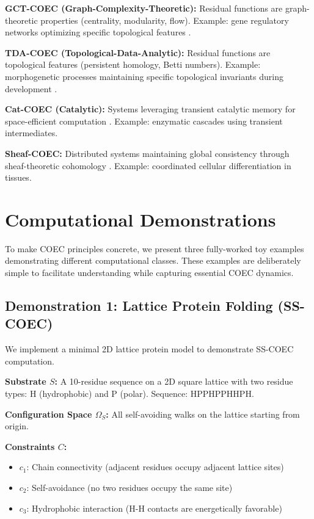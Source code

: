 \documentclass[11pt]{article}
\begin{document}
\textbf{GCT-COEC (Graph-Complexity-Theoretic):} Residual functions are graph-theoretic properties (centrality, modularity, flow). Example: gene regulatory networks optimizing specific topological features \citep{alon2007network}.

\textbf{TDA-COEC (Topological-Data-Analytic):} Residual functions are topological features (persistent homology, Betti numbers). Example: morphogenetic processes maintaining specific topological invariants during development \citep{carlsson2009topology}.

\textbf{Cat-COEC (Catalytic):} Systems leveraging transient catalytic memory for space-efficient computation \citep{buhrman2014catalytic}. Example: enzymatic cascades using transient intermediates.

\textbf{Sheaf-COEC:} Distributed systems maintaining global consistency through sheaf-theoretic cohomology \citep{robinson2014topological}. Example: coordinated cellular differentiation in tissues.

\section{Computational Demonstrations}
\label{sec:demonstrations}

To make COEC principles concrete, we present three fully-worked toy examples demonstrating different computational classes. These examples are deliberately simple to facilitate understanding while capturing essential COEC dynamics.

\subsection{Demonstration 1: Lattice Protein Folding (SS-COEC)}

We implement a minimal 2D lattice protein model to demonstrate SS-COEC computation.

\textbf{Substrate $S$:} A 10-residue sequence on a 2D square lattice with two residue types: H (hydrophobic) and P (polar). Sequence: HPPHPPHHPH.

\textbf{Configuration Space $\Omega_S$:} All self-avoiding walks on the lattice starting from origin.

\textbf{Constraints $C$:}
\begin{itemize}
\item $c_1$: Chain connectivity (adjacent residues occupy adjacent lattice sites)
\item $c_2$: Self-avoidance (no two residues occupy the same site)
\item $c_3$: Hydrophobic interaction (H-H contacts are energetically favorable)
\end{itemize}
\end{document}
